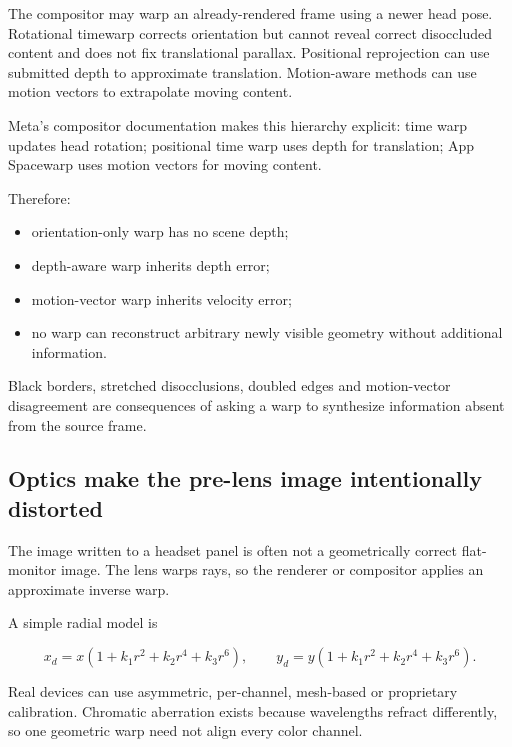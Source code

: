 The compositor may warp an already-rendered frame using a newer head pose. Rotational timewarp corrects orientation but cannot reveal correct disoccluded content and does not fix translational parallax. Positional reprojection can use submitted depth to approximate translation. Motion-aware methods can use motion vectors to extrapolate moving content.

Meta's compositor documentation makes this hierarchy explicit: time warp updates head rotation; positional time warp uses depth for translation; App Spacewarp uses motion vectors for moving content.

Therefore:

\begin{itemize}
\tightlist
\item
  orientation-only warp has no scene depth;
\item
  depth-aware warp inherits depth error;
\item
  motion-vector warp inherits velocity error;
\item
  no warp can reconstruct arbitrary newly visible geometry without additional information.
\end{itemize}

Black borders, stretched disocclusions, doubled edges and motion-vector disagreement are consequences of asking a warp to synthesize information absent from the source frame.

\subsection{Optics make the pre-lens image intentionally distorted}\label{04-visual-computing-ii-ch035-optics-make-the-pre-lens-image-intentionally-distorted}

\hypertarget{04-visual-computing-ii-ch035-optics-make-the-pre-lens-image-intentionally-distorted}{}

The image written to a headset panel is often not a geometrically correct flat-monitor image. The lens warps rays, so the renderer or compositor applies an approximate inverse warp.

A simple radial model is

\[
x_d=x(1+k_1r^2+k_2r^4+k_3r^6), \qquad
y_d=y(1+k_1r^2+k_2r^4+k_3r^6).
\]

Real devices can use asymmetric, per-channel, mesh-based or proprietary calibration. Chromatic aberration exists because wavelengths refract differently, so one geometric warp need not align every color channel.

